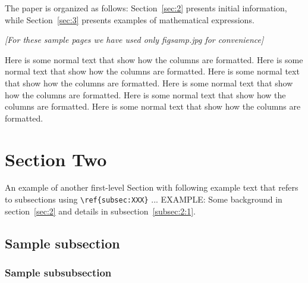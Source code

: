 \documentclass[reprint]{JASA}
\begin{document}
The paper is organized as follows: Section~\ref{sec:2} presents
initial information, while
Section~\ref{sec:3} presents examples of mathematical expressions.

{\it
[For these sample pages we have used only figsamp.jpg for
convenience]}

Here is some normal text that
show how the columns are formatted.
Here is some normal text that
show how the columns are formatted.
Here is some normal text that
show how the columns are formatted.
Here is some normal text that
show how the columns are formatted.
Here is some normal text that
show how the columns are formatted.
Here is some normal text that
show how the columns are formatted.


\section{\label{sec:2} Section Two}
An example of another first-level Section with following example text that refers to subsections using 
\verb+\ref{subsec:XXX}+ ...  EXAMPLE: Some background in
section~\ref{sec:2} and details  in subsection~\ref{subsec:2:1}. 

\subsection{\label{subsec:2:1} Sample subsection}

\subsubsection{Sample subsubsection\label{subsubsec:1}}





\end{document}
